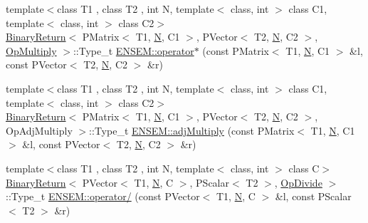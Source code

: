 \begin{DoxyCompactItemize}
\item 
{\footnotesize template$<$class T1 , class T2 , int N, template$<$ class, int $>$ class C1, template$<$ class, int $>$ class C2$>$ }\\\mbox{\hyperlink{structBinaryReturn}{Binary\+Return}}$<$ P\+Matrix$<$ T1, \mbox{\hyperlink{adat__devel_2lib_2hadron_2operator__name__util_8cc_a7722c8ecbb62d99aee7ce68b1752f337}{N}}, C1 $>$, P\+Vector$<$ T2, \mbox{\hyperlink{adat__devel_2lib_2hadron_2operator__name__util_8cc_a7722c8ecbb62d99aee7ce68b1752f337}{N}}, C2 $>$, \mbox{\hyperlink{structOpMultiply}{Op\+Multiply}} $>$\+::Type\+\_\+t \mbox{\hyperlink{group__primvector_gabc873d4c0d9c1d0ff8638e1674f29a72}{E\+N\+S\+E\+M\+::operator$\ast$}} (const P\+Matrix$<$ T1, \mbox{\hyperlink{adat__devel_2lib_2hadron_2operator__name__util_8cc_a7722c8ecbb62d99aee7ce68b1752f337}{N}}, C1 $>$ \&l, const P\+Vector$<$ T2, \mbox{\hyperlink{adat__devel_2lib_2hadron_2operator__name__util_8cc_a7722c8ecbb62d99aee7ce68b1752f337}{N}}, C2 $>$ \&r)
\item 
{\footnotesize template$<$class T1 , class T2 , int N, template$<$ class, int $>$ class C1, template$<$ class, int $>$ class C2$>$ }\\\mbox{\hyperlink{structBinaryReturn}{Binary\+Return}}$<$ P\+Matrix$<$ T1, \mbox{\hyperlink{adat__devel_2lib_2hadron_2operator__name__util_8cc_a7722c8ecbb62d99aee7ce68b1752f337}{N}}, C1 $>$, P\+Vector$<$ T2, \mbox{\hyperlink{adat__devel_2lib_2hadron_2operator__name__util_8cc_a7722c8ecbb62d99aee7ce68b1752f337}{N}}, C2 $>$, Op\+Adj\+Multiply $>$\+::Type\+\_\+t \mbox{\hyperlink{group__primvector_ga1728ca784073c199bee500323e8ae96e}{E\+N\+S\+E\+M\+::adj\+Multiply}} (const P\+Matrix$<$ T1, \mbox{\hyperlink{adat__devel_2lib_2hadron_2operator__name__util_8cc_a7722c8ecbb62d99aee7ce68b1752f337}{N}}, C1 $>$ \&l, const P\+Vector$<$ T2, \mbox{\hyperlink{adat__devel_2lib_2hadron_2operator__name__util_8cc_a7722c8ecbb62d99aee7ce68b1752f337}{N}}, C2 $>$ \&r)
\item 
{\footnotesize template$<$class T1 , class T2 , int N, template$<$ class, int $>$ class C$>$ }\\\mbox{\hyperlink{structBinaryReturn}{Binary\+Return}}$<$ P\+Vector$<$ T1, \mbox{\hyperlink{adat__devel_2lib_2hadron_2operator__name__util_8cc_a7722c8ecbb62d99aee7ce68b1752f337}{N}}, C $>$, P\+Scalar$<$ T2 $>$, \mbox{\hyperlink{structOpDivide}{Op\+Divide}} $>$\+::Type\+\_\+t \mbox{\hyperlink{group__primvector_gac0d72c4d06047ab6be5503cc1b557a16}{E\+N\+S\+E\+M\+::operator/}} (const P\+Vector$<$ T1, \mbox{\hyperlink{adat__devel_2lib_2hadron_2operator__name__util_8cc_a7722c8ecbb62d99aee7ce68b1752f337}{N}}, C $>$ \&l, const P\+Scalar$<$ T2 $>$ \&r)

\end{DoxyCompactItemize}
